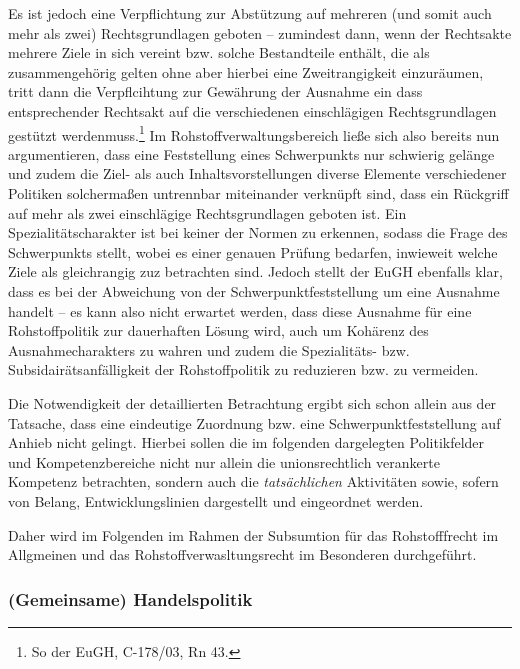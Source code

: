 \documentclass[12pt,a4paper,oneside]{book} %
\begin{document}
Es ist jedoch eine Verpflichtung zur Abstützung auf mehreren (und somit auch mehr als zwei) Rechtsgrundlagen geboten -- zumindest dann, wenn der Rechtsakte mehrere Ziele in sich vereint bzw. solche Bestandteile enthält, die als zusammengehörig gelten ohne aber hierbei eine Zweitrangigkeit einzuräumen, tritt dann die Verpflcihtung zur Gewährung der Ausnahme ein dass entsprechender Rechtsakt auf die \glqq verschiedenen einschlägigen Rechtsgrundlagen gestützt werden\grqq muss.\footnote{So der EuGH, C-178/03, Rn 43.} Im Rohstoffverwaltungsbereich ließe sich also bereits nun argumentieren, dass eine Feststellung eines Schwerpunkts nur schwierig gelänge und zudem die Ziel- als auch Inhaltsvorstellungen diverse Elemente verschiedener Politiken solchermaßen untrennbar miteinander verknüpft sind, dass ein Rückgriff auf mehr als zwei einschlägige Rechtsgrundlagen geboten ist. Ein Spezialitätscharakter ist bei keiner der Normen zu erkennen, sodass die Frage des Schwerpunkts stellt, wobei es einer genauen Prüfung bedarfen, inwieweit welche Ziele als gleichrangig zuz betrachten sind. Jedoch stellt der EuGH ebenfalls klar, dass es bei der Abweichung von der Schwerpunktfeststellung um eine Ausnahme handelt -- es kann also nicht erwartet werden, dass diese Ausnahme für eine Rohstoffpolitik zur dauerhaften Lösung wird, auch um Kohärenz des Ausnahmecharakters zu wahren und zudem die Spezialitäts- bzw. Subsidairätsanfälligkeit der Rohstoffpolitik zu reduzieren bzw. zu vermeiden.
	
Die Notwendigkeit der detaillierten Betrachtung ergibt sich schon allein aus der Tatsache, dass eine eindeutige Zuordnung bzw. eine Schwerpunktfeststellung auf Anhieb nicht gelingt. Hierbei sollen die im folgenden dargelegten Politikfelder und Kompetenzbereiche nicht nur allein die unionsrechtlich verankerte Kompetenz betrachten, sondern auch die \textit{tatsächlichen} Aktivitäten sowie, sofern von Belang, Entwicklungslinien dargestellt und eingeordnet werden.
	
Daher wird im Folgenden im Rahmen der Subsumtion für das Rohstofffrecht im Allgmeinen und das Rohstoffverwasltungsrecht im Besonderen durchgeführt.
	
\subsubsection{(Gemeinsame) Handelspolitik}

	
\end{document}
